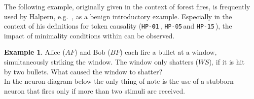 \documentclass[11pt,a4paper]{book}
\theoremstyle{definition}
\theoremstyle{definition}
\newtheorem{example}{Example}[section]
\theoremstyle{definition}
\theoremstyle{remark}
\newcommand{\hpo}{\texttt{HP-01}\,}
\newcommand{\hpu}{\texttt{HP-05}\,}
\newcommand{\hpm}{\texttt{HP-15}\,}
\begin{document}
The following example, originally given in the context of forest fires, is frequently used by Halpern, e.g.\ \parencite{halpern2011actual,halpern2015graded}, as a benign introductory example.
Especially in the context of his definitions for token causality (\hpo, \hpu and \hpm), the impact of minimality conditions within can be observed.

\begin{example}
\label{ex:basic-2}
Alice ($\mathit{AF}$) and Bob ($\mathit{BF}$) each fire a bullet at a window, simultaneously striking the window. The window only shatters ($\mathit{WS}$), if it is hit by two bullets. What caused the window to shatter? \\

In the neuron diagram below the only thing of note is the use of a stubborn neuron that fires only if more than two stimuli are received.
\begin{center}
\end{center}
\end{example}

%
%
\end{document}
